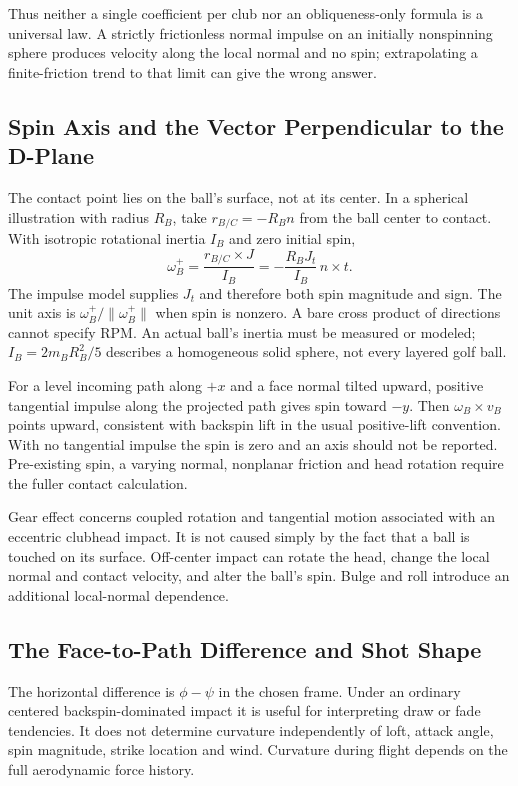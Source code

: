 Thus neither a single coefficient per club nor an obliqueness-only formula
is a universal law. A strictly frictionless normal impulse on an initially
nonspinning sphere produces velocity along the local normal and no spin;
extrapolating a finite-friction trend to that limit can give the wrong answer.

\subsection{Spin Axis and the Vector Perpendicular to the D-Plane}

The contact point lies on the ball's surface, not at its center. In a
spherical illustration with radius $R_B$, take $r_{B/C}=-R_Bn$ from the ball
center to contact. With isotropic rotational inertia $I_B$ and zero initial spin,
\begin{equation}
\omega_B^+=\frac{r_{B/C}\times J}{I_B}
=-\frac{R_BJ_t}{I_B}\,n\times t.
\label{eq:spin_axis}
\end{equation}
The impulse model supplies $J_t$ and therefore both spin magnitude and sign.
The unit axis is $\omega_B^+/\|\omega_B^+\|$ when spin is nonzero. A bare
cross product of directions cannot specify RPM. An actual ball's inertia
must be measured or modeled; $I_B=2m_BR_B^2/5$ describes a homogeneous solid
sphere, not every layered golf ball.

For a level incoming path along $+x$ and a face normal tilted upward,
positive tangential impulse along the projected path gives spin toward $-y$.
Then $\omega_B\times v_B$ points upward, consistent with backspin lift in
the usual positive-lift convention. With no tangential impulse the spin is
zero and an axis should not be reported. Pre-existing spin, a varying normal,
nonplanar friction and head rotation require the fuller contact calculation.

Gear effect concerns coupled rotation and tangential motion associated with
an eccentric clubhead impact. It is not caused simply by the fact that a
ball is touched on its surface. Off-center impact can rotate the head, change
the local normal and contact velocity, and alter the ball's spin. Bulge and
roll introduce an additional local-normal dependence.

\subsection{The Face-to-Path Difference and Shot Shape}

The horizontal difference is $\phi-\psi$ in the chosen frame. Under an
ordinary centered backspin-dominated impact it is useful for interpreting
draw or fade tendencies. It does not determine curvature independently of
loft, attack angle, spin magnitude, strike location and wind. Curvature during
flight depends on the full aerodynamic force history.

